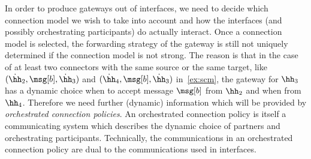 In order to produce  gateways out of interfaces, we need to decide 
which connection model we wish to take into account and how 
the interfaces (and possibly orchestrating participants) do actually interact. 
 Once a connection model is selected, the forwarding strategy of the gateway
is still not uniquely determined  if the connection model is not strong. 
 The reason is that in the case of at least two connectors with the same source or the same target, like $(\dot\hh_2,\msg[b],\dot\hh_3)$ and $(\dot\hh_4,\msg[b],\dot\hh_3)$ in~\cref{ex:scm}, the gateway for $\hh_3$
has a dynamic choice when to accept message $\msg[b]$ from $\hh_2$
and when from $\hh_4$. Therefore we need further (dynamic) information
which will be provided by {\em orchestrated connection policies\/}. 
An orchestrated connection policy is itself a communicating system which describes the dynamic choice of partners and orchestrating participants.
Technically, the communications in an orchestrated connection policy are dual to the communications used in interfaces. 

 


